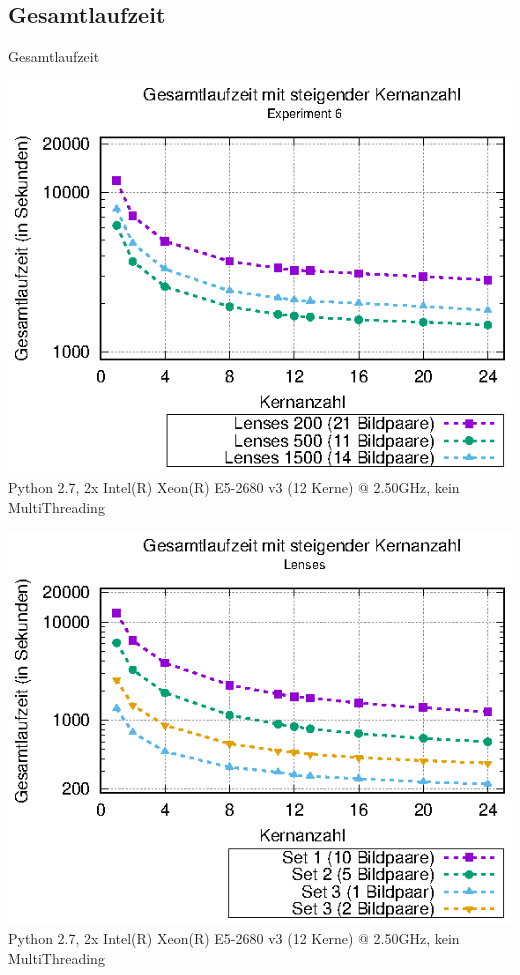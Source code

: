 \subsection{Gesamtlaufzeit}
\begin{frame}[allowframebreaks]{Gesamtlaufzeit}
	\begin{center}
		\includegraphics[width=0.6\linewidth]{pdf/times_exp6} \\
		\scriptsize
		Python 2.7, 2x Intel(R) Xeon(R) E5-2680 v3 (12 Kerne) @ 2.50GHz, kein MultiThreading
	\end{center}
	
	\framebreak
	
	\begin{center}
		\includegraphics[width=0.6\linewidth]{pdf/times_lenses} \\
		\scriptsize
		Python 2.7, 2x Intel(R) Xeon(R) E5-2680 v3 (12 Kerne) @ 2.50GHz, kein MultiThreading
	\end{center}
\end{frame}

